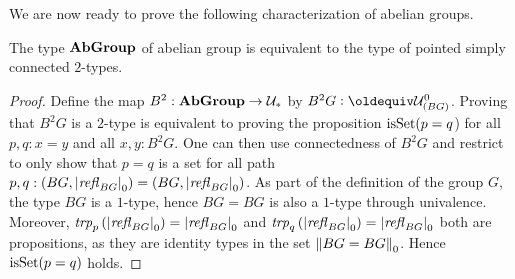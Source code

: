 We are now ready to prove the following characterization of abelian
groups.
\begin{theorem}
  The type $\mathbf{AbGroup}$ of abelian group is equivalent to the type
  of pointed simply connected $2$-types.
\end{theorem}
\begin{proof}%
  \newcommand{\BB}{B^2}%
  \newcommand{\UUptd}{\UU_\ast}%
  Define the map $\BB : \typeabgroup \to \UUptd$ by
  $\BB G\defequi \univcover{\UU}{BG}$. Proving that $\BB G$ is a
  $2$-type is equivalent to proving the proposition $\mathrm{isSet}(p=q$) for
  all $p,q:x=y$ and all $x,y:\BB G$. One can then use connectedness of
  $\BB G$ and restrict to only show that $p=q$ is a set for all path
  $p,q:(BG,{\lvert\mathop{\mathit{refl}_{BG}}\rvert}_0)=(BG,{\lvert\mathop{\mathit{refl}_{BG}}\rvert}_0)$. As part
  of the definition of the group $G$, the type $BG$ is a $1$-type,
  hence $BG=BG$ is also a $1$-type through univalence. Moreover,
  $\trp p {(\settrunc{\refl {BG}}}) = \settrunc{\refl {BG}}$ and
  $\trp q {(\settrunc{\refl {BG}}}) = \settrunc{\refl {BG}}$ both are
  propositions, as they are identity types in the set
  ${\lVert BG=BG\rVert}_0$. Hence $\mathrm{isSet}(p=q)$ holds.


\end{proof}

